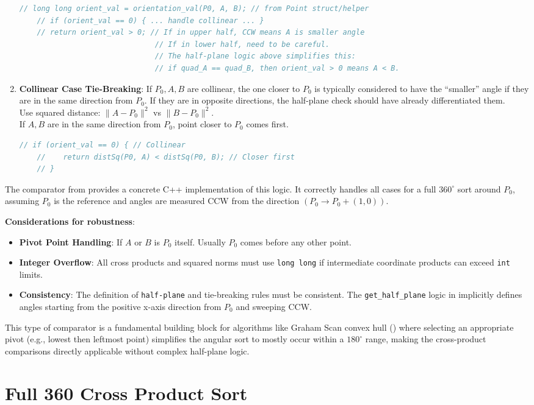 \begin{openquestion}
\begin{enumerate}
    \begin{lstlisting}[language=C++]
    // long long orient_val = orientation_val(P0, A, B); // from Point struct/helper
    // if (orient_val == 0) { ... handle collinear ... }
    // return orient_val > 0; // If in upper half, CCW means A is smaller angle
                               // If in lower half, need to be careful.
                               // The half-plane logic above simplifies this:
                               // if quad_A == quad_B, then orient_val > 0 means A < B.
    \end{lstlisting}

    \item \textbf{Collinear Case Tie-Breaking}: If $P_0, A, B$ are collinear, the one closer to $P_0$ is typically considered to have the ``smaller'' angle if they are in the same direction from $P_0$. If they are in opposite directions, the half-plane check should have already differentiated them. \\
    Use squared distance: $\|A-P_0\|^2$ vs $\|B-P_0\|^2$. \\
    If $A, B$ are in the same direction from $P_0$, point closer to $P_0$ comes first.
    \begin{lstlisting}[language=C++]
    // if (orient_val == 0) { // Collinear
    //    return distSq(P0, A) < distSq(P0, B); // Closer first
    // }
    \end{lstlisting}
\end{enumerate}

The comparator from  provides a concrete C++ implementation of this logic. It correctly handles all cases for a full $360^\circ$ sort around $P_0$, assuming $P_0$ is the reference and angles are measured CCW from the direction $(P_0 \to P_0 + (1,0))$.

\textbf{Considerations for robustness}:
\begin{itemize}
    \item \textbf{Pivot Point Handling}: If $A$ or $B$ is $P_0$ itself. Usually $P_0$ comes before any other point.
    \item \textbf{Integer Overflow}: All cross products and squared norms must use \texttt{long long} if intermediate coordinate products can exceed \texttt{int} limits.
    \item \textbf{Consistency}: The definition of \texttt{half-plane} and tie-breaking rules must be consistent. The \texttt{get\_half\_plane} logic in  implicitly defines angles starting from the positive x-axis direction from $P_0$ and sweeping CCW.
\end{itemize}

This type of comparator is a fundamental building block for algorithms like Graham Scan convex hull () where selecting an appropriate pivot (e.g., lowest then leftmost point) simplifies the angular sort to mostly occur within a $180^\circ$ range, making the cross-product comparisons directly applicable without complex half-plane logic.

\end{openquestion}

\section{Full 360 Cross Product Sort}
\label{impl:A.4.2.full-360-cross-product-sort}
